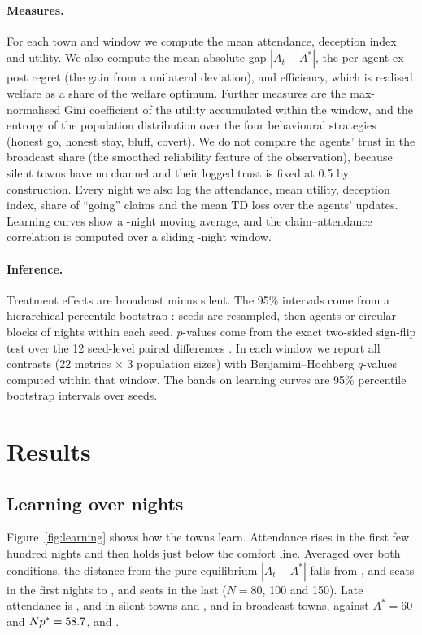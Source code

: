 \documentclass[11pt]{article}
\begin{document}
\paragraph{Measures.} For each town and window we compute the mean attendance, deception index and utility. We also compute the mean absolute gap $|A_t - A^*|$, the per-agent ex-post regret (the gain from a unilateral deviation), and efficiency, which is realised welfare as a share of the welfare optimum. Further measures are the max-normalised Gini coefficient of the utility accumulated within the window, and the entropy of the population distribution over the four behavioural strategies (honest go, honest stay, bluff, covert). We do not compare the agents' trust in the broadcast share (the smoothed reliability feature of the observation), because silent towns have no channel and their logged trust is fixed at 0.5 by construction. Every night we also log the attendance, mean utility, deception index, share of ``going'' claims and the mean TD loss over the agents' updates. Learning curves show a \rsmooth-night moving average, and the claim--attendance correlation is computed over a sliding \rcorrWindow-night window.

\paragraph{Inference.} Treatment effects are broadcast minus silent. The 95\% intervals come from a hierarchical percentile bootstrap \citep{efron1993}: seeds are resampled, then agents or circular blocks of nights within each seed. $p$-values come from the exact two-sided sign-flip test over the 12 seed-level paired differences \citep{fisher1935}. In each window we report all \rnTestsLate{} contrasts (22 metrics $\times$ 3 population sizes) with Benjamini--Hochberg $q$-values computed within that window. The bands on learning curves are 95\% percentile bootstrap intervals over seeds.

\section{Results}\label{sec:results}

\subsection{Learning over \rnightsLong{} nights}

Figure~\ref{fig:learning} shows how the towns learn. Attendance rises in the first few hundred nights and then holds just below the comfort line. Averaged over both conditions, the distance from the pure equilibrium $|A_t - A^*|$ falls from \rgapEarlyLXXX, \rgapEarlyC{} and \rgapEarlyCL{} seats in the first \rnightsShort{} nights to \rgapLateLXXX, \rgapLateC{} and \rgapLateCL{} seats in the last \rnightsLate{} ($N = 80$, 100 and 150). Late attendance is \rattLateCtlLXXX, \rattLateCtlC{} and \rattLateCtlCL{} in silent towns and \rattLateBcLXXX, \rattLateBcC{} and \rattLateBcCL{} in broadcast towns, against $A^* = 60$ and $Np^* = 58.7$, \rmixedAC{} and \rmixedACL.
\end{document}
